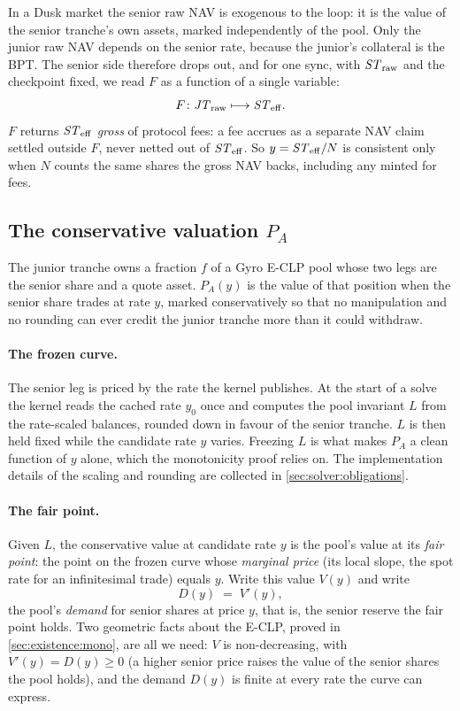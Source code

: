 In a Dusk market the senior raw NAV is exogenous to the loop: it is the
value of the senior tranche's own assets, marked independently of the
pool. Only the junior raw NAV depends on the senior rate, because the
junior's collateral is the BPT. The senior side therefore drops out, and
for one sync, with $\mathit{ST}_{\mathrm{raw}}$ and the checkpoint fixed, we read $F$ as a
function of a single variable:
\[
  F\colon \mathit{JT}_{\mathrm{raw}} \longmapsto \mathit{ST}_{\mathrm{eff}}.
\]
$F$ returns $\mathit{ST}_{\mathrm{eff}}$ \emph{gross} of protocol fees: a fee accrues as a
separate NAV claim settled outside $F$, never netted out of $\mathit{ST}_{\mathrm{eff}}$. So
$y = \mathit{ST}_{\mathrm{eff}}/N$ is consistent only when $N$ counts the same shares the
gross NAV backs, including any minted for fees.

\subsection{The conservative valuation $P_A$}
\label{sec:setup:PA}

The junior tranche owns a fraction $f$ of a
Gyro E-CLP pool whose two legs are the senior share and a quote asset.
$P_A(y)$ is the value of that position when the senior share trades at
rate $y$, marked conservatively so that no manipulation and no rounding
can ever credit the junior tranche more than it could withdraw.

\paragraph{The frozen curve.}
The senior leg is priced by the rate the kernel publishes. At the start of a solve the
kernel reads the cached rate $y_0$ once and computes the pool invariant
$L$ from the rate-scaled balances, rounded down in favour of the senior
tranche. $L$ is then held fixed while the candidate rate $y$ varies.
Freezing $L$ is what makes $P_A$ a clean function of $y$ alone, which the
monotonicity proof relies on. The implementation details of the scaling
and rounding are collected in \cref{sec:solver:obligations}.

\paragraph{The fair point.}
Given $L$, the conservative value at candidate rate $y$ is the pool's
value at its \emph{fair point}: the point on the frozen curve whose
\emph{marginal price} (its local slope, the spot rate for an
infinitesimal trade) equals $y$. Write this value $V(y)$ and write
\[
  D(y) \;=\; V'(y),
\]
the pool's \emph{demand} for senior shares at price $y$, that is, the
senior reserve the fair point holds. Two geometric facts about the
E-CLP, proved in \cref{sec:existence:mono}, are all we need: $V$ is
non-decreasing, with $V'(y) = D(y) \geq 0$ (a higher senior price raises
the value of the senior shares the pool holds), and the demand $D(y)$ is
finite at every rate the curve can express.

